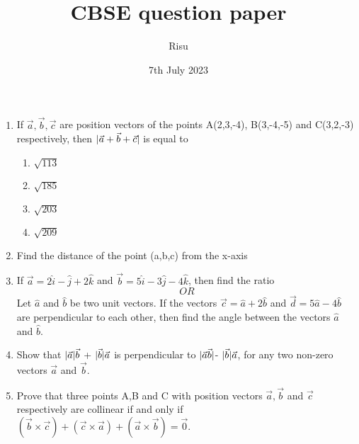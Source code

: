 \documentclass[12pt]{article}
\DeclarePairedDelimiter\abs{\lvert}{\rvert}
\begin{document}
\title{\textbf{CBSE question paper}}
\author{Risu}
\date{7th July 2023}
\maketitle
\begin{enumerate}
	\item If $ \vec{a},\vec{b}, \vec{c} $ are position vectors of the points A(2,3,-4), B(3,-4,-5) and C(3,2,-3) respectively, then $ \abs{\vec{a}+\vec{b}+\vec{c}} $ is equal to
		\begin{enumerate}
			\item $\sqrt{113}$
			\item $\sqrt{185}$
			\item $\sqrt{203}$
			\item $\sqrt{209}$
		\end{enumerate}
\item Find the distance of the point (a,b,c) from the x-axis
\item If $ \vec{a}=2\hat{i}-\hat{j}+2\hat{k} $ and $ \vec{b}=5\hat{i}-3\hat{j}-4\hat{k} $, then find the ratio
 $$ OR $$
 Let $\hat{a}$ and $\hat{b}$  be two unit vectors. If the vectors $\vec{c}=\hat{a}+2\hat{b}$ and $\vec{d}=5\hat{a}-4\hat{b}$ are perpendicular to each other, then find the angle between the vectors $\hat{a}$ and $\hat{b}$.
\item Show that $ \abs{\vec{a}} \vec{b}$ + $ \abs{\vec{b}} \vec{a}$ is perpendicular to $\abs{\vec{a} \vec{b}} $- $ \abs{\vec{b}} \vec{a} $, for any two non-zero vectors $\vec{a}$ and $\vec{b}$.
\item Prove that three points A,B and C with position vectors $\vec{a}, \vec{b}$ and $\vec{c}$ respectively are collinear if and only if $( \vec{b} \times \vec{c})+(\vec{c} \times \vec{a})+(\vec{a} \times \vec{b}) = \vec{0}$.
\end{enumerate}
\end{document}
